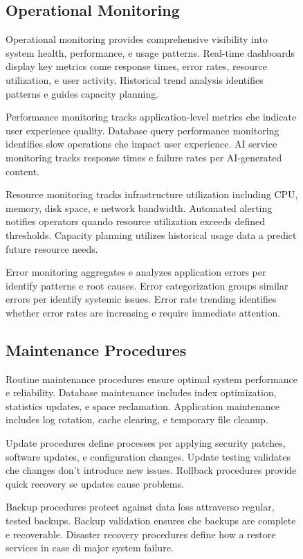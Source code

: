 \documentclass[12pt,a4paper]{article}
\begin{document}
\begin{figure}[H]
\subsection{Operational Monitoring}

Operational monitoring provides comprehensive visibility into system health, performance, e usage patterns. Real-time dashboards display key metrics come response times, error rates, resource utilization, e user activity. Historical trend analysis identifies patterns e guides capacity planning.

Performance monitoring tracks application-level metrics che indicate user experience quality. Database query performance monitoring identifies slow operations che impact user experience. AI service monitoring tracks response times e failure rates per AI-generated content.

Resource monitoring tracks infrastructure utilization including CPU, memory, disk space, e network bandwidth. Automated alerting notifies operators quando resource utilization exceeds defined thresholds. Capacity planning utilizes historical usage data a predict future resource needs.

Error monitoring aggregates e analyzes application errors per identify patterns e root causes. Error categorization groups similar errors per identify systemic issues. Error rate trending identifies whether error rates are increasing e require immediate attention.

\subsection{Maintenance Procedures}

Routine maintenance procedures ensure optimal system performance e reliability. Database maintenance includes index optimization, statistics updates, e space reclamation. Application maintenance includes log rotation, cache clearing, e temporary file cleanup.

Update procedures define processes per applying security patches, software updates, e configuration changes. Update testing validates che changes don't introduce new issues. Rollback procedures provide quick recovery se updates cause problems.

Backup procedures protect against data loss attraverso regular, tested backups. Backup validation ensures che backups are complete e recoverable. Disaster recovery procedures define how a restore services in case di major system failure.


\end{figure}
\end{document}
